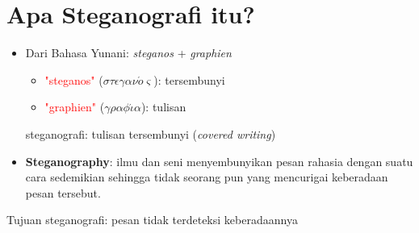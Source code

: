 \documentclass{article}
\begin{document}

\section*{Apa Steganografi itu?}

\begin{itemize}
    \item Dari Bahasa Yunani: \textit{steganos} + \textit{graphien}
    \begin{itemize}
        \item \textcolor{red}{"steganos"} ($\sigma\tau\epsilon\gamma\alpha\nu\acute{o}\varsigma$): tersembunyi
        \item \textcolor{red}{"graphien"} ($\gamma\rho\alpha\phi\acute{\iota}\alpha$): tulisan
    \end{itemize}
    steganografi: tulisan tersembunyi (\textit{covered writing})
    
    \item \textbf{Steganography}: ilmu dan seni menyembunyikan pesan rahasia dengan suatu cara sedemikian sehingga tidak seorang pun yang mencurigai keberadaan pesan tersebut.
\end{itemize}

Tujuan steganografi: pesan tidak terdeteksi keberadaannya
\end{document}
